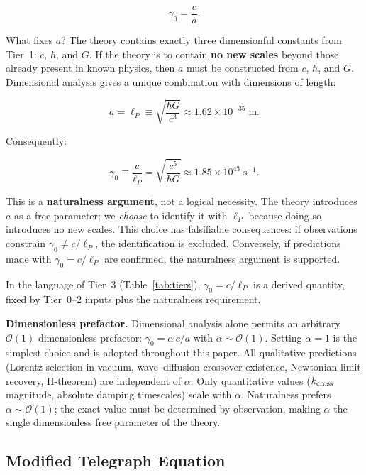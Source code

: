 \documentclass[aps,prd,twocolumn,showpacs,superscriptaddress,preprintnumbers]{revtex4-2}
\begin{document}
\begin{equation}
\gamma_0 = \frac{c}{a}.
\label{eq:gamma0_form}
\end{equation}

What fixes $a$? The theory contains exactly three dimensionful constants from Tier~1: $c$, $\hbar$, and $G$.
If the theory is to contain \textbf{no new scales} beyond those already present in known physics, then $a$ must be constructed from $c$, $\hbar$, and $G$.
Dimensional analysis gives a unique combination with dimensions of length:

\begin{equation}
a = \ell_P \equiv \sqrt{\frac{\hbar G}{c^3}} \approx 1.62 \times 10^{-35}\;\text{m}.
\label{eq:lp_def}
\end{equation}

Consequently:

\begin{equation}
\boxed{\gamma_0 \equiv \frac{c}{\ell_P} = \sqrt{\frac{c^5}{\hbar G}} \approx 1.85 \times 10^{43}\;\text{s}^{-1}}.
\label{eq:gamma0}
\end{equation}

This is a \textbf{naturalness argument}, not a logical necessity.
The theory introduces $a$ as a free parameter; we \emph{choose} to identify it with $\ell_P$ because doing so introduces no new scales.
This choice has falsifiable consequences: if observations constrain $\gamma_0 \neq c/\ell_P$, the identification is excluded.
Conversely, if predictions made with $\gamma_0=c/\ell_P$ are confirmed, the naturalness argument is supported.

In the language of Tier~3 (Table~\ref{tab:tiers}), $\gamma_0=c/\ell_P$ is a derived quantity, fixed by Tier~0--2 inputs plus the naturalness requirement.

\textbf{Dimensionless prefactor.}
Dimensional analysis alone permits an arbitrary $\mathcal{O}(1)$ dimensionless prefactor: $\gamma_0 = \alpha\,c/a$ with $\alpha\sim\mathcal{O}(1)$.
Setting $\alpha=1$ is the simplest choice and is adopted throughout this paper.
All qualitative predictions (Lorentz selection in vacuum, wave--diffusion crossover existence, Newtonian limit recovery, H-theorem) are independent of $\alpha$.
Only quantitative values ($k_{\rm cross}$ magnitude, absolute damping timescales) scale with $\alpha$.
Naturalness prefers $\alpha\sim\mathcal{O}(1)$; the exact value must be determined by observation, making $\alpha$ the single dimensionless free parameter of the theory.

\subsection{Modified Telegraph Equation}
\end{document}
